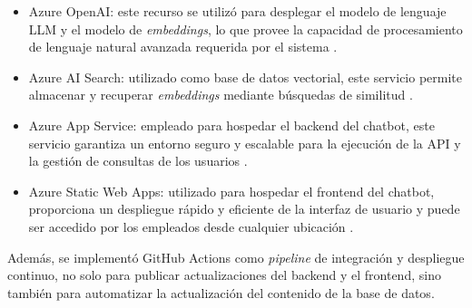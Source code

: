 \begin{itemize}
	\item Azure OpenAI: este recurso se utilizó para desplegar el modelo de lenguaje LLM y el modelo de \textit{embeddings}, 
	lo que provee la capacidad de procesamiento de lenguaje natural avanzada requerida por el sistema \citep{website:azure-openai}.
	\item Azure AI Search: utilizado como base de datos vectorial, este servicio permite almacenar y recuperar \textit{embeddings} 
	mediante búsquedas de similitud \citep{website:ai-search}.
	\item Azure App Service: empleado para hospedar el backend del chatbot, este servicio garantiza un entorno seguro y 
	escalable para la ejecución de la API y la gestión de consultas de los usuarios \citep{website:app-service}.
	\item Azure Static Web Apps: utilizado para hospedar el frontend del chatbot, proporciona un despliegue 
	rápido y eficiente de la interfaz de usuario y puede ser accedido por los empleados desde cualquier ubicación \citep{website:static-web-app}.
\end{itemize}

Además, se implementó GitHub Actions \citep{website:github-actions} como \textit{pipeline} de integración y despliegue continuo, no solo para publicar 
actualizaciones del backend y el frontend, sino también para automatizar la actualización del contenido de la base de datos.